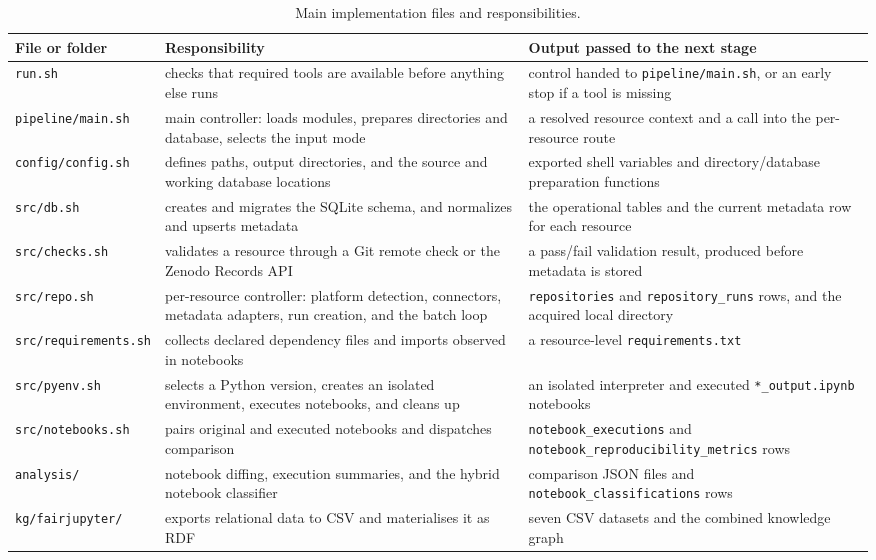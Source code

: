 \begin{table}[ht]
\centering
\caption{Main implementation files and responsibilities.}
\label{tab:implementation-files}
\small
\begin{tabularx}{\textwidth}{@{}p{2.7cm}XX@{}}
\toprule
File or folder & Responsibility & Output passed to the next stage\tabularnewline
\midrule
\texttt{run.sh} & checks that required tools are available before anything else runs & control handed to \texttt{pipeline/main.sh}, or an early stop if a tool is missing\tabularnewline
\texttt{pipeline/}\linebreak\texttt{main.sh} & main controller: loads modules, prepares directories and database, selects the input mode & a resolved resource context and a call into the per-resource route\tabularnewline
\texttt{config/}\linebreak\texttt{config.sh} & defines paths, output directories, and the source and working database locations & exported shell variables and directory/database preparation functions\tabularnewline
\texttt{src/db.sh} & creates and migrates the SQLite schema, and normalizes and upserts metadata & the operational tables and the current metadata row for each resource\tabularnewline
\texttt{src/checks.sh} & validates a resource through a Git remote check or the Zenodo Records API & a pass/fail validation result, produced before metadata is stored\tabularnewline
\texttt{src/repo.sh} & per-resource controller: platform detection, connectors, metadata adapters, run creation, and the batch loop & \texttt{repositories} and \texttt{repository\_runs} rows, and the acquired local directory\tabularnewline
\texttt{src/}\linebreak\texttt{requirements.sh} & collects declared dependency files and imports observed in notebooks & a resource-level \texttt{requirements.txt}\tabularnewline
\texttt{src/pyenv.sh} & selects a Python version, creates an isolated environment, executes notebooks, and cleans up & an isolated interpreter and executed \texttt{*\_output.ipynb} notebooks\tabularnewline
\texttt{src/}\linebreak\texttt{notebooks.sh} & pairs original and executed notebooks and dispatches comparison & \texttt{notebook\_executions} and \texttt{notebook\_reproducibility\_metrics} rows\tabularnewline
\texttt{analysis/} & notebook diffing, execution summaries, and the hybrid notebook classifier & comparison JSON files and \texttt{notebook\_classifications} rows\tabularnewline
\texttt{kg/}\linebreak\texttt{fairjupyter/} & exports relational data to CSV and materialises it as RDF & seven CSV datasets and the combined knowledge graph\tabularnewline
\bottomrule
\end{tabularx}
\end{table}

